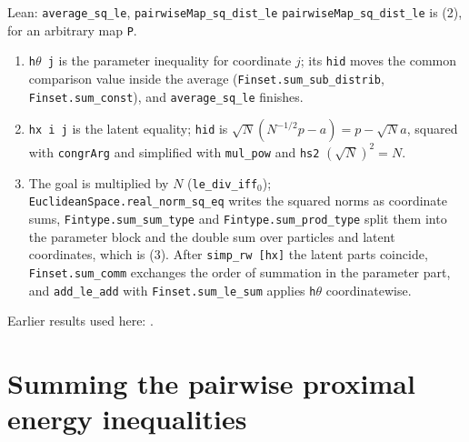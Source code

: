 \documentclass[11pt,a4paper]{article}
\begin{document}
\begin{leanbox}{Lean: \texttt{average\_\allowbreak{}sq\_\allowbreak{}le}, \texttt{pairwiseMap\_\allowbreak{}sq\_\allowbreak{}dist\_\allowbreak{}le}}
\texttt{pairwise\allowbreak{}Map\_\allowbreak{}sq\_\allowbreak{}dist\_\allowbreak{}le} is (2), for an arbitrary map \texttt{P}.



\begin{enumerate}


\item \texttt{h\ensuremath{\theta} j} is the parameter inequality for coordinate \(j\); its \texttt{hid} moves the common comparison value inside the average (\texttt{Finset.\allowbreak{}sum\_\allowbreak{}sub\_\allowbreak{}distrib}, \texttt{Finset.\allowbreak{}sum\_\allowbreak{}const}), and \texttt{average\_\allowbreak{}sq\_\allowbreak{}le} finishes.

\item \texttt{hx i j} is the latent equality; \texttt{hid} is \(\sqrt N(N^{-1/2}p-a)=p-\sqrt Na\), squared with \texttt{congr\allowbreak{}Arg} and simplified with \texttt{mul\_\allowbreak{}pow} and \texttt{hs2} \((\sqrt N)^2=N\).

\item The goal is multiplied by \(N\) (\texttt{le\_\allowbreak{}div\_\allowbreak{}iff\ensuremath{{}_{0}}}); \texttt{Euclidean\allowbreak{}Space.\allowbreak{}real\_\allowbreak{}norm\_\allowbreak{}sq\_\allowbreak{}eq} writes the squared norms as coordinate sums, \texttt{Fintype.\allowbreak{}sum\_\allowbreak{}sum\_\allowbreak{}type} and \texttt{Fintype.\allowbreak{}sum\_\allowbreak{}prod\_\allowbreak{}type} split them into the parameter block and the double sum over particles and latent coordinates, which is (3). After \texttt{simp\_\allowbreak{}rw [hx]} the latent parts coincide, \texttt{Finset.\allowbreak{}sum\_\allowbreak{}comm} exchanges the order of summation in the parameter part, and \texttt{add\_\allowbreak{}le\_\allowbreak{}add} with \texttt{Finset.\allowbreak{}sum\_\allowbreak{}le\_\allowbreak{}sum} applies \texttt{h\ensuremath{\theta}} coordinatewise.

\end{enumerate}
\end{leanbox}


Earlier results used here: \cite[Section~3.1.1]{LangevinLean2026IPLA}.

\section{\texorpdfstring{Summing the pairwise proximal energy inequalities}{Summing the pairwise proximal energy inequalities}}
\end{document}
